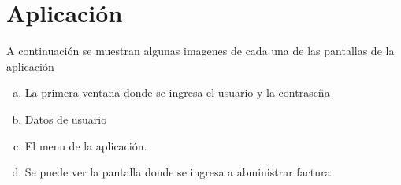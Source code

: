 \documentclass[a4paper,11pt]{article}
\begin{document}
\section{ Aplicación}
A continuación se muestran algunas imagenes de  cada una de las pantallas de la aplicación
\begin{enumerate}[a)]
     
     \item La primera ventana donde se ingresa el usuario y la contraseña
    \item Datos de usuario
    \item El menu de la aplicación.
    \item Se puede ver la pantalla donde se ingresa a abministrar factura.
      

\end{enumerate}
\end{document}
